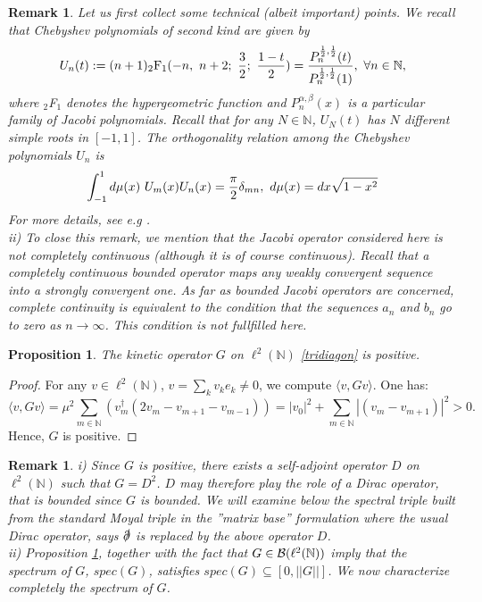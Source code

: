 \documentclass[a4paper]{jpconf}
\numberwithin{equation}{section}
\newtheorem{proposition}[Theorem]{Proposition}
\newtheorem{remark}[Theorem]{Remark}
\theoremstyle{nonumberplain}
\newtheorem{proof}{Proof}
\begin{document}
\begin{remark}
Let us first collect some technical (albeit important) points. We recall that Chebyshev polynomials of second kind are given by
\begin{equation}
U_n(t):=(n+1){\mbox{$_2$F$_1$}(-n,\ n+2;\ {{3}\over{2}};\ {{1-t}\over{2}})}={{P_n^{{{1}\over{2}},{{1}\over{2}}}(t) }\over{P_n^{{{1}\over{2}},{{1}\over{2}}}(1) }}, \ \forall n\in\mathbb{N}\label{defcheb},
\end{equation}
where $_2$F$_1$ denotes the hypergeometric function and $P_n^{\alpha,\beta}(x)$ is a particular family of Jacobi polynomials. Recall that for any $N\in\mathbb{N}$, $U_N(t)$ has $N$ different simple roots in $[-1,1]$. The orthogonality relation among the Chebyshev polynomials $U_n$ is
\begin{equation}
\int_{-1}^1d\mu(x)\ U_m(x)U_n(x)={{\pi}\over{2}}\delta_{mn},\ d\mu(x)=dx{\sqrt{1-x^2}}\label{orthocontinucheb2}
\end{equation}
For more details, see e.g \cite{kks}. \\
ii) To close this remark, we mention that the Jacobi operator considered here is not completely continuous (although it is of course continuous). Recall that a completely continuous bounded operator maps any weakly convergent sequence into a strongly convergent one. As far as bounded Jacobi operators are concerned, complete continuity is equivalent to the condition that the sequences $a_n$ and $b_n$ go to zero as $n\to\infty$. This condition is not fullfilled here.
\end{remark}
\begin{proposition}\label{g-positive}
The kinetic operator $G$ on $\ell^2(\mathbb{N})$ \eqref{tridiagon} is positive.
\end{proposition}
\begin{proof}
For any $v\in\ell^2(\mathbb{N})$, $v=\sum_kv_ke_k\ne0$, we compute $\langle v,Gv\rangle$. One has:
\begin{equation}
\langle v,Gv\rangle=\mu^2\sum_{m\in\mathbb{N}}(v_m^\dag(2v_m-v_{m+1}-v_{m-1}))=|v_0|^2+\sum_{m\in\mathbb{N}}|(v_m-v_{m+1})|^2>0.
\end{equation}
Hence, $G$ is positive.
\end{proof}
\begin{remark}\label{locate-spectrum}
i) Since $G$ is positive, there exists a self-adjoint operator $D$ on $\ell^2(\mathbb{N})$ such that $G=D^2$. $D$ may therefore play the role of a Dirac operator, that is bounded since $G$ is bounded. We will examine below the spectral triple built from the standard Moyal triple in the ''matrix base'' formulation where the usual Dirac operator, says $\slashed\partial$ is replaced by the above operator $D$. \\
ii) Proposition \ref{g-positive}, together with the fact that $G\in{\cal{B}}(\ell^2(\mathbb{N}))$ imply that the spectrum of $G$, $spec(G)$, satisfies $spec(G)\subseteq[0,||G||]$. We now characterize completely the spectrum of $G$.
\end{remark}
\end{document}
